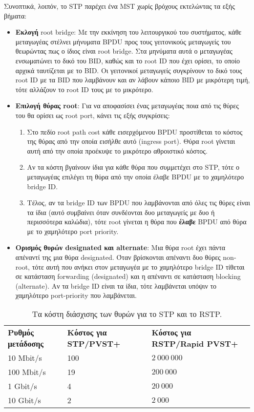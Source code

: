 \documentclass[eforms]{EdipyLabs} %
\begin{document}
Συνοπτικά, λοιπόν, το STP παρέχει ένα MST χωρίς βρόχους εκτελώντας τα εξής βήματα:
\begin{itemize}
	\item \textbf{Εκλογή} root bridge: Με την εκκίνηση του λειτουργικού του συστήματος, κάθε μεταγωγέας στέλνει μήνυματα BPDU προς τους γειτονικούς μεταγωγείς του θεωρώντας πως ο ίδιος είναι root bridge. Στα μηνύματα αυτά ο μεταγωγέας ενσωματώνει το δικό του BID, καθώς και το root ID που έχει ορίσει, το οποίο αρχικά ταυτίζεται με το BID. Οι γειτονικοί μεταγωγείς συγκρίνουν το δικό τους root ID με τα BID που λαμβάνουν και αν λάβουν κάποιο BID με μικρότερη τιμή, τότε αλλάζουν το root ID τους με το μικρότερο.
	\item \textbf{Επιλογή θύρας root}: Για να αποφασίσει ένας μεταγωγέας ποια από τις θύρες του θα ορίσει ως root port, κάνει τις εξής συγκρίσεις:
	\begin{enumerate}
	\item Στο πεδίο root path cost κάθε εισερχόμενου BPDU προστίθεται το κόστος της θύρας από την οποία εισήλθε αυτό (ingress port). Θύρα root γίνεται αυτή από την οποία προέκυψε το μικρότερο αθροιστικό κόστος. 
	\item Αν τα κόστη βγαίνουν ίδια για κάθε θύρα που συμμετέχει στο STP, τότε ο μεταγωγέας επιλέγει τη θύρα από την οποία έλαβε BPDU με το χαμηλότερο bridge ID.
	\item Τέλος, αν τα bridge ID των BPDU που λαμβάνονται από όλες τις θύρες είναι τα ίδια (αυτό συμβαίνει όταν συνδέονται δυο μεταγωγείς με δυο ή περισσότερα καλώδια), τότε root γίνεται η θύρα που \textbf{έλαβε} BPDU από θύρα με το χαμηλότερο port priority. 
	\end{enumerate}
	\item \textbf{Ορισμός θυρών designated και alternate}: Μια θύρα root έχει πάντα απέναντί της μια θύρα designated. Όταν βρίσκονται απέναντι δυο θύρες non-root, τότε αυτή που ανήκει στον μεταγωγέα με το χαμηλότερο bridge ID τίθεται σε κατάσταση forwarding (designated) και η απέναντι σε κατάσταση blocking (alternate). Αν τα bridge ID είναι τα ίδια, τότε λαμβάνεται υπόψιν το χαμηλότερο port-priority που λαμβάνεται.
\end{itemize}

\begin{table}[ht]\renewcommand\arraystretch{1.5}
	\centering
		\begin{tabular}{lll}\FormatFirstRow
			\textbf{Ρυθμός μετάδοσης} & \textbf{Κόστος για STP/PVST+} 	 & \textbf{Κόστος για RSTP/Rapid PVST+}\\
			10 Mbit/s				  & 100		 	 			 & $2\ 000\ 000$ \\ 
			100 Mbit/s				  & 19		   				 & $200\ 000$ \\
			1 Gbit/s			 	  & 4			   			 & $20\ 000$ \\
			10 Gbit/s 				  & 2 		   				 & $2\ 000$
		\end{tabular}
	\caption{Τα κόστη διάσχισης των θυρών για το STP και το RSTP.}\label{tab:costs}
\end{table}
\end{document}
